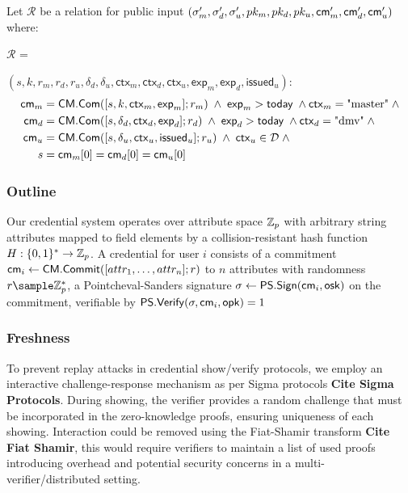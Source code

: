 \noindent Let $\mathcal{R}$ be a relation for public input $(\sigma_m', \sigma_d', \sigma_u', pk_m, pk_d, pk_u, \mathsf{cm}_m', \mathsf{cm}_d', \mathsf{cm}_u')$ where:

$\mathcal{R}$ = {$(s, k, r_m, r_d, r_u, \delta_d, \delta_u, \mathsf{ctx}_m, \mathsf{ctx}_d, \mathsf{ctx}_u, \mathsf{exp}_m, \mathsf{exp}_d, \mathsf{issued}_u)$:
\begin{align*}
    \mathsf{cm}_m &= \mathsf{CM.Com}([s, k, \mathsf{ctx}_m, \mathsf{exp}_m]; r_m) \; \wedge \; \mathsf{exp}_m > \mathsf{today} \; \wedge \mathsf{ctx}_m = \text{"master"} \; \wedge\\
    \mathsf{cm}_d &= \mathsf{CM.Com}([s, \delta_d, \mathsf{ctx}_d, \mathsf{exp}_d]; r_d) \; \wedge \; \mathsf{exp}_d > \mathsf{today} \; \wedge \mathsf{ctx}_d = \text{"dmv"} \; \wedge\\
    \mathsf{cm}_u &= \mathsf{CM.Com}([s, \delta_u, \mathsf{ctx}_u, \mathsf{issued}_u]; r_u) \; \wedge \; \mathsf{ctx}_u \in \mathcal{D} \; \wedge\\
    s &= \mathsf{cm}_m[0] = \mathsf{cm}_d[0] = \mathsf{cm}_u[0]
\end{align*}





\subsubsection{Outline}
Our credential system operates over attribute space $\mathbb{Z}_p$ with arbitrary string attributes mapped to field elements by a collision-resistant hash function $H: \{0,1\}^* \to \mathbb{Z}_p$. A credential for user $i$ consists of a 
commitment $\mathsf{cm}_i \gets \mathsf{CM.Commit}([attr_1,\ldots,attr_n]; r)$ to $n$ attributes with randomness $r \sample \Z_p^*$, a Pointcheval-Sanders signature $\sigma \gets \mathsf{PS.Sign}(\mathsf{cm}_i, \mathsf{osk})$ on the commitment, verifiable by $\mathsf{PS.Verify}(\sigma, \mathsf{cm}_i, \mathsf{opk}) = 1$

\subsubsection{Freshness}
To prevent replay attacks in credential show/verify protocols, we employ an interactive challenge-response mechanism as per Sigma protocols \textbf{Cite Sigma Protocols}. During showing, the verifier provides a random challenge that must be incorporated in the zero-knowledge proofs, ensuring uniqueness of each showing. Interaction could be removed using the Fiat-Shamir transform \textbf{Cite Fiat Shamir}, this would require verifiers to maintain a list of used proofs introducing overhead and potential security concerns in a multi-verifier/distributed setting.

}
